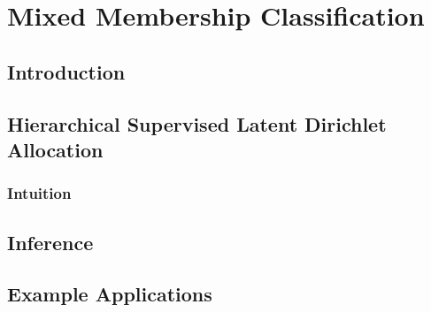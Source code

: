 


\chapter{Mixed Membership Classification}


\section{Introduction}

\label{sec:introduction} 



\section{Hierarchical Supervised Latent Dirichlet Allocation}
\label{sec:HSLDA}



\subsection{Intuition}
\label{sec:intuition}



\section{Inference}
\label{sec:inference}




\section{Example Applications}

